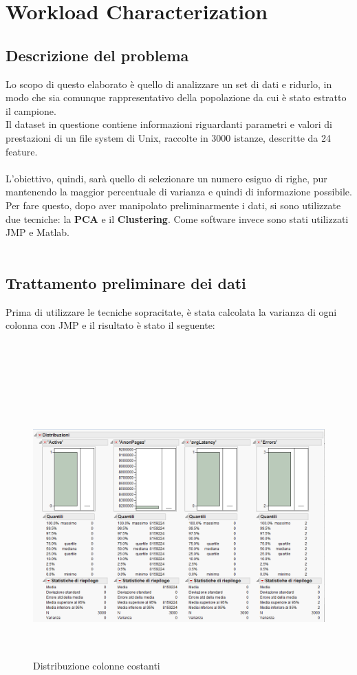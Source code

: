 \chapter{Workload Characterization}

\section{Descrizione del problema}
Lo scopo di questo elaborato è quello di analizzare un set di dati e ridurlo, in modo che sia comunque rappresentativo della popolazione da cui è stato estratto il campione.\\
Il dataset in questione contiene informazioni riguardanti parametri e valori di prestazioni di un file system di Unix, raccolte in 3000 istanze, descritte da 24 feature.\\\\
L'obiettivo, quindi, sarà quello di selezionare un numero esiguo di righe, pur mantenendo la maggior percentuale di varianza e quindi di informazione possibile.\\
Per fare questo, dopo aver manipolato preliminarmente i dati, si sono utilizzate due tecniche: la \textbf{PCA} e il \textbf{Clustering}. Come software invece sono stati utilizzati JMP e Matlab.\\\\

\section{Trattamento preliminare dei dati}
Prima di utilizzare le tecniche sopracitate, è stata calcolata la varianza di ogni colonna con JMP e il risultato è stato il seguente:\\\\\\\\\\

\begin{figure}[!h]
	\centering
	\includegraphics[width=15cm, height=10cm]{./immagine/colonne_costanti.png}
	\caption{Distribuzione colonne costanti}
	\label{fig:colonne_costanti}
\end{figure}

